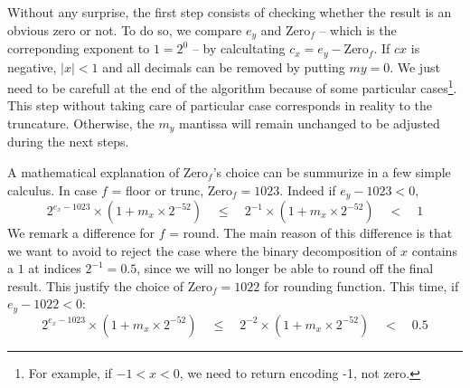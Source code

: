 \documentclass[runningheads]{llncs}
\begin{document}
        Without any surprise, the first step consists of checking whether the result is an obvious zero or not.
        To do so, we compare $e_y$ and Zero$_f$ -- which is the correponding exponent to  $1=2^0$ -- by calcultating $c_x = e_y - \text{Zero}_f$.
        If $cx$ is negative, $\mid x \mid <1$ and all decimals can be removed by putting $my = 0$.
        We just need to be carefull at the end of the algorithm because of some particular cases\footnote{For example, if $-1<x<0$, we need to return encoding -1, not zero.}.
        This step without taking care of particular case corresponds in reality to the truncature.
        Otherwise, the $m_y$ mantissa will remain unchanged to be adjusted during the next steps.

        A mathematical explanation of Zero$_f$'s choice can be summurize in a few simple calculus.
        In case $f$ = floor or trunc, Zero$_f = 1023$.
        Indeed if $e_y -1023 <0$, $$2^{e_x-1023} \times (1+m_x\times 2^{-52})\quad\leq \quad 2^{-1} \times (1+m_x\times 2^{-52}) \quad< \quad 1$$ 
        We remark a difference for $f$ = round.
        The main reason of this difference is that we want to avoid to reject the case where the binary decomposition of $x$ contains a $1$ at indices $2^{-1} = 0.5$, 
        since we will no longer be able to round off the final result.
        This justify the choice of  Zero$_f =1022$ for rounding function.
        This time, if $e_y -1022 <0$: 
        $$2^{e_x-1023} \times (1+m_x\times 2^{-52})\quad\leq \quad 2^{-2} \times (1+m_x\times 2^{-52}) \quad< \quad 0.5$$ 
        
\end{document}
